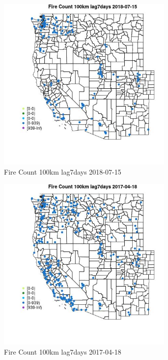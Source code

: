 \begin{figure} 
\centering  
\includegraphics[width=0.77\textwidth]{Code_Outputs/Report_ML_input_PM25_Step4_part_e_de_duplicated_aves_compiled_2019-05-21wNAs_MapObsFire_Count_100km_lag7days2018-07-15.jpg} 
\caption{\label{fig:Report_ML_input_PM25_Step4_part_e_de_duplicated_aves_compiled_2019-05-21wNAsMapObsFire_Count_100km_lag7days2018-07-15}Fire Count 100km lag7days 2018-07-15} 
\end{figure} 
 

\begin{figure} 
\centering  
\includegraphics[width=0.77\textwidth]{Code_Outputs/Report_ML_input_PM25_Step4_part_e_de_duplicated_aves_compiled_2019-05-21wNAs_MapObsFire_Count_100km_lag7days2017-04-18.jpg} 
\caption{\label{fig:Report_ML_input_PM25_Step4_part_e_de_duplicated_aves_compiled_2019-05-21wNAsMapObsFire_Count_100km_lag7days2017-04-18}Fire Count 100km lag7days 2017-04-18} 
\end{figure} 
 

